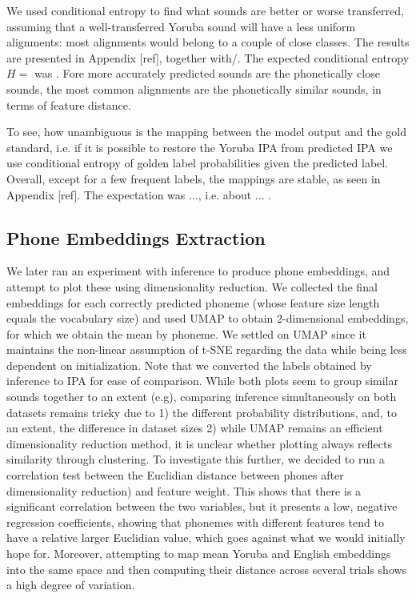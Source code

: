 \documentclass[11pt]{article}
\begin{document}
{We used conditional entropy to find what sounds are better or worse transferred, assuming that a well-transferred Yoruba sound will have a less uniform alignments: most alignments would belong to a couple of close classes. The results are presented in Appendix [ref], together with/. The expected conditional entropy $H = $ was \texttt{}. Fore more accurately predicted sounds are the phonetically close sounds, the most common alignments are the phonetically similar sounds, in terms of feature distance.

To see, how unambiguous is the mapping between the model output and the gold standard, i.e. if it is possible to restore the Yoruba IPA from predicted IPA we use conditional entropy of golden label probabilities given the predicted label. Overall, except for a few frequent labels, the mappings are stable, as seen in Appendix [ref]. The expectation was ..., i.e. about ... .

\subsection{Phone Embeddings Extraction}
We later ran an experiment with inference to produce phone embeddings, and attempt to plot these using dimensionality reduction. We collected the final embeddings for each correctly predicted phoneme (whose feature size length equals the vocabulary size) and used UMAP to obtain 2-dimensional embeddings, for which we obtain the mean by phoneme. We settled on UMAP since it maintains the non-linear assumption of t-SNE regarding the data while being less dependent on initialization. Note that we converted the labels obtained by inference to IPA for ease of comparison. While both plots seem to group similar sounds together to an extent (e.g), comparing inference simultaneously on both datasets remains tricky due to 1) the different probability distributions, and, to an extent, the difference in dataset sizes 2) while UMAP remains an efficient dimensionality reduction method, it is unclear whether plotting always reflects similarity through clustering.
To investigate this further, we decided to run a correlation test between the Euclidian distance between phones after dimensionality reduction) and feature weight. This shows that there is a significant correlation between the two variables, but it presents a low, negative regression coefficients, showing that phonemes with different features tend to have a relative larger Euclidian value, which goes against what we would initially hope for. Moreover, attempting to map mean Yoruba and English embeddings into the same space and then computing their distance across several trials shows a high degree of variation.

}
\end{document}
